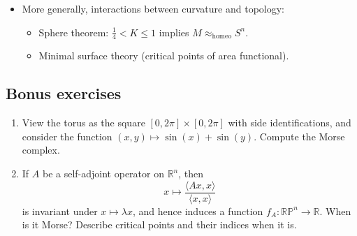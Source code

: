 \documentclass{article}
\theoremstyle{definition}
\newcommand{\homeo}{\mathrm{homeo}}
\newcommand{\RP}{\mathbb{RP}}
\newcommand{\R}{\mathbb{R}}
\begin{document}
\begin{enumerate}[label=\textbf{\Roman* -}]
\begin{enumerate}[label=(\alph*)]
\begin{itemize}
                    \item More generally, interactions between curvature and
                        topology:
                        \begin{itemize}
                            \item Sphere theorem: $\frac{1}{4}<K\le 1$ implies
                                $M\approx_\homeo S^n$.

                            \item Minimal surface theory (critical points of
                                area functional).
                        \end{itemize}
                \end{itemize}
        \end{enumerate}
\end{enumerate}

\subsection*{Bonus exercises}

\begin{enumerate}[label=(\arabic*)]
    \item View the torus as the square $[0,2\pi]\times[0,2\pi]$ with side
        identifications, and consider the function
        $(x,y)\mapsto\sin(x)+\sin(y)$. Compute the Morse complex.

    \item If $A$ be a self-adjoint operator on $\R^n$, then
        \begin{equation*}
            x \mapsto \frac{\langle Ax,x\rangle}{\langle x,x\rangle}
        \end{equation*}
        is invariant under $x\mapsto\lambda x$, and hence induces a function
        $f_A:\RP^n\to\R$. When is it Morse? Describe critical points and their
        indices when it is.
\end{enumerate}
\end{document}
